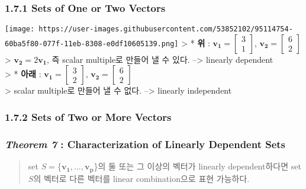 \documentclass[11pt]{article}
\begin{document}
    \hypertarget{sets-of-one-or-two-vectors}{%
\subsubsection{1.7.1 Sets of One or Two
Vectors}\label{sets-of-one-or-two-vectors}}

\texttt{[image: https://user-images.githubusercontent.com/53852102/95114754-60ba5f80-077f-11eb-8308-e0df10605139.png]}
\textgreater{} * \textbf{위} :
\(\mathbf{v_{1}} = \begin{bmatrix} 3 \\ 1 \end{bmatrix}\),
\(\mathbf{v_{2}} = \begin{bmatrix} 6 \\ 2\end{bmatrix}\)\\
\textgreater{} \(\mathbf{v_{2}} = 2\mathbf{v_{1}}\), 즉 scalar
multiple로 만들어 낼 수 있다. --\textgreater{} linearly dependent\\
\textgreater{} * \textbf{아래} :
\(\mathbf{v_{1}} = \begin{bmatrix} 3 \\ 2 \end{bmatrix}\),
\(\mathbf{v_{2}} = \begin{bmatrix} 6 \\ 2\end{bmatrix}\)\\
\textgreater{} scalar multiple로 만들어 낼 수 없다. --\textgreater{}
linearly independent

\hypertarget{sets-of-two-or-more-vectors}{%
\subsubsection{1.7.2 Sets of Two or More
Vectors}\label{sets-of-two-or-more-vectors}}

\hypertarget{theorem-7-characterization-of-linearly-dependent-sets}{%
\subsubsection{\texorpdfstring{\emph{Theorem 7} : Characterization of
Linearly Dependent
Sets}{Theorem 7 : Characterization of Linearly Dependent Sets}}\label{theorem-7-characterization-of-linearly-dependent-sets}}

\begin{quote}
set \(S =\)\{\(\mathbf{v_{1}}, \dots, \mathbf{v_{p}}\)\}의 둘 또는 그
이상의 벡터가 linearly dependent하다면 set \(S\)의 벡터로 다른 벡터를
linear combination으로 표현 가능하다.
\end{quote}
\end{document}
